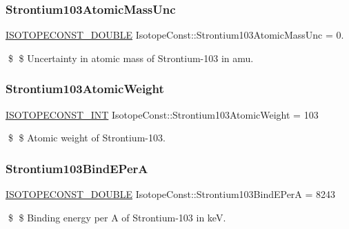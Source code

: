\subsubsection{\texorpdfstring{Strontium103\+Atomic\+Mass\+Unc}{Strontium103AtomicMassUnc}}
{\footnotesize\ttfamily \mbox{\hyperlink{group___isotope_const-_macros_ga8f45a7272ce02c0b4c65c44636ed719a}{I\+S\+O\+T\+O\+P\+E\+C\+O\+N\+S\+T\+\_\+\+D\+O\+U\+B\+LE}} Isotope\+Const\+::\+Strontium103\+Atomic\+Mass\+Unc = 0.}

\$ \$ Uncertainty in atomic mass of Strontium-\/103 in amu. \mbox{\label{group___isotope_const-_strontium-_sr103_ga17abfdac55a2e24aa2b4e3bc80ba1e48}} 
\subsubsection{\texorpdfstring{Strontium103\+Atomic\+Weight}{Strontium103AtomicWeight}}
{\footnotesize\ttfamily \mbox{\hyperlink{group___isotope_const-_macros_ga5f18360b3e99483a35c32d789e62621c}{I\+S\+O\+T\+O\+P\+E\+C\+O\+N\+S\+T\+\_\+\+I\+NT}} Isotope\+Const\+::\+Strontium103\+Atomic\+Weight = 103}

\$ \$ Atomic weight of Strontium-\/103. \mbox{\label{group___isotope_const-_strontium-_sr103_ga52bf156ab9d8d68d5c5b358a14e4aaa8}} 
\subsubsection{\texorpdfstring{Strontium103\+Bind\+E\+PerA}{Strontium103BindEPerA}}
{\footnotesize\ttfamily \mbox{\hyperlink{group___isotope_const-_macros_ga8f45a7272ce02c0b4c65c44636ed719a}{I\+S\+O\+T\+O\+P\+E\+C\+O\+N\+S\+T\+\_\+\+D\+O\+U\+B\+LE}} Isotope\+Const\+::\+Strontium103\+Bind\+E\+PerA = 8243}

\$ \$ Binding energy per A of Strontium-\/103 in keV. \mbox{\label{group___isotope_const-_strontium-_sr103_ga638b82cf3193f915b7f1d712ab5d0862}} 
